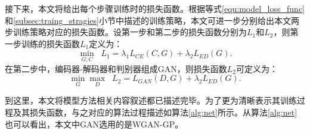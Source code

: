 接下来，本文将给出每个步骤训练时的损失函数。根据等式\ref{equ:model_loss_func}和\ref{subsec:traing_stragies}小节中描述的训练策略，本文可进一步分别给出本文两步训练策略对应的损失函数。设第一步和第二步的损失函数分别为$L_1$和$L_2$，则第一步训练的损失函数$L_1$定义为：
\begin{equation}
\min_{G, C} \;\; L_{1}=\lambda_1 L_{CE}(C,G) + \lambda_2 L_{ED}(G).
\end{equation}
在第二步中，编码器-解码器和判别器组成GAN，则损失函数$L_2$可定义为：
\begin{equation}
\min_{G} \max_D \;\; L_{2}= L_{GAN}(D,G) + \lambda_2 L_{ED}(G).
\end{equation}

到这里，本文将模型方法相关内容叙述都已描述完毕。为了更为清晰表示其训练过程及其损失函数，与之对应的算法过程描述如算法\ref{alg:net}所示。从算法\ref{alg:net}也可以看出，本文中GAN选用的是WGAN-GP。

